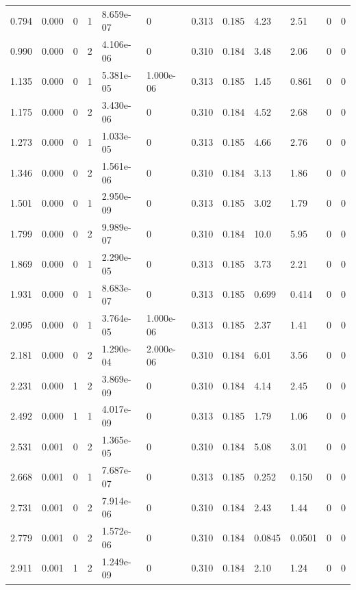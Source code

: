 \documentclass[preview]{standalone}
\begin{document}
{{\begin{tabular}{L{1.2cm}C{1.2cm} C{0.3cm}C{0.5cm} C{1.4cm}C{1.4cm} C{1.4cm}C{1.4cm} C{1.6cm}C{1.6cm} C{1.6cm}C{1.6cm}}
  0.794  &  0.000  & 0     &  1 &  8.659e-07  & 0  &  0.313&   0.185& 4.23 & 2.51   &  0 & 0  \\ 
  0.990  &  0.000  & 0     &  2 &  4.106e-06  & 0  &  0.310&   0.184& 3.48 & 2.06   &  0 & 0  \\ 
  1.135  &  0.000  & 0     &  1 &  5.381e-05  & 1.000e-06  &  0.313&   0.185& 1.45 & 0.861   &  0 & 0  \\ 
  1.175  &  0.000  & 0     &  2 &  3.430e-06  & 0  &  0.310&   0.184& 4.52 & 2.68   &  0 & 0  \\ 
  1.273  &  0.000  & 0     &  1 &  1.033e-05  & 0  &  0.313&   0.185& 4.66 & 2.76   &  0 & 0  \\ 
  1.346  &  0.000  & 0     &  2 &  1.561e-06  & 0  &  0.310&   0.184& 3.13 & 1.86   &  0 & 0  \\ 
  1.501  &  0.000  & 0     &  1 &  2.950e-09  & 0  &  0.313&   0.185& 3.02 & 1.79   &  0 & 0  \\ 
  1.799  &  0.000  & 0     &  2 &  9.989e-07  & 0  &  0.310&   0.184& 10.0 & 5.95   &  0 & 0  \\ 
  1.869  &  0.000  & 0     &  1 &  2.290e-05  & 0  &  0.313&   0.185& 3.73 & 2.21   &  0 & 0  \\ 
  1.931  &  0.000  & 0     &  1 &  8.683e-07  & 0  &  0.313&   0.185& 0.699 & 0.414   &  0 & 0  \\ 
  2.095  &  0.000  & 0     &  1 &  3.764e-05  & 1.000e-06  &  0.313&   0.185& 2.37 & 1.41   &  0 & 0  \\ 
  2.181  &  0.000  & 0     &  2 &  1.290e-04  & 2.000e-06  &  0.310&   0.184& 6.01 & 3.56   &  0 & 0  \\ 
  2.231  &  0.000  & 1     &  2 &  3.869e-09  & 0  &  0.310&   0.184& 4.14 & 2.45   &  0 & 0  \\ 
  2.492  &  0.000  & 1     &  1 &  4.017e-09  & 0  &  0.313&   0.185& 1.79 & 1.06   &  0 & 0  \\ 
  2.531  &  0.001  & 0     &  2 &  1.365e-05  & 0  &  0.310&   0.184& 5.08 & 3.01   &  0 & 0  \\ 
  2.668  &  0.001  & 0     &  1 &  7.687e-07  & 0  &  0.313&   0.185& 0.252 & 0.150   &  0 & 0  \\ 
  2.731  &  0.001  & 0     &  2 &  7.914e-06  & 0  &  0.310&   0.184& 2.43 & 1.44   &  0 & 0  \\ 
  2.779  &  0.001  & 0     &  2 &  1.572e-06  & 0  &  0.310&   0.184& 0.0845 & 0.0501   &  0 & 0  \\ 
  2.911  &  0.001  & 1     &  2 &  1.249e-09  & 0  &  0.310&   0.184& 2.10 & 1.24   &  0 & 0  \\ 

\end{tabular}}}
\end{document}
